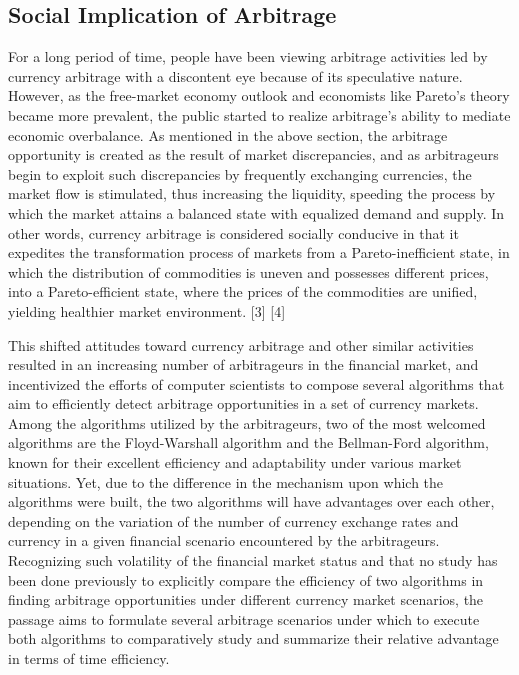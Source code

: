 \documentclass[12pt]{article}
\begin{document}
\subsection{Social Implication of Arbitrage}
For a long period of time, people have been viewing arbitrage activities led by currency arbitrage with a discontent eye because of its speculative nature. However, as the free-market economy outlook and economists like Pareto’s theory became more prevalent, the public started to realize arbitrage’s ability to mediate economic overbalance. As mentioned in the above section, the arbitrage opportunity is created as the result of market discrepancies, and as arbitrageurs begin to exploit such discrepancies by frequently exchanging currencies, the market flow is stimulated, thus increasing the liquidity, speeding the process by which the market attains a balanced state with equalized demand and supply. In other words, currency arbitrage is considered socially conducive in that it expedites the transformation process of markets from a Pareto-inefficient state, in which the distribution of commodities is uneven and possesses different prices, into a Pareto-efficient state, where the prices of the commodities are unified, yielding healthier market environment. [3] [4]

\hspace*{\fill} %

This shifted attitudes toward currency arbitrage and other similar activities resulted in an increasing number of arbitrageurs in the financial market, and incentivized the efforts of computer scientists to compose several algorithms that aim to efficiently detect arbitrage opportunities in a set of currency markets. Among the algorithms utilized by the arbitrageurs, two of the most welcomed algorithms are the Floyd-Warshall algorithm and the Bellman-Ford algorithm, known for their excellent efficiency and adaptability under various market situations. Yet, due to the difference in the mechanism upon which the algorithms were built, the two algorithms will have advantages over each other, depending on the variation of the number of currency exchange rates and currency in a given financial scenario encountered by the arbitrageurs. Recognizing such volatility of the financial market status and that no study has been done previously to explicitly compare the efficiency of two algorithms in finding arbitrage opportunities under different currency market scenarios, the passage aims to formulate several arbitrage scenarios under which to execute both algorithms to comparatively study and summarize their relative advantage in terms of time efficiency.
\end{document}
